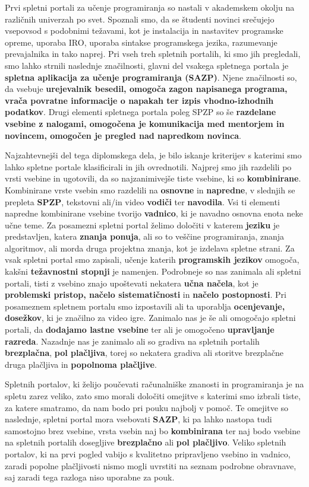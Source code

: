 Prvi spletni portali za učenje programiranja so nastali v akademskem
okolju na različnih univerzah po svet. Spoznali smo, da se študenti
novinci srečujejo vsepovsod s podobnimi težavami, kot je instalacija
in nastavitev programske opreme, uporaba IRO, uporaba sintakse
programskega jezika, razumevanje prevajalnika in tako
naprej. Pri vseh treh spletnih portalih, ki smo jih pregledali, smo
lahko strnili naslednje značilnosti, glavni del vsakega spletnega
portala je \textbf{spletna aplikacija za učenje programiranja
  (SAZP)}. Njene značilnosti so, da vsebuje \textbf{urejevalnik
  besedil, omogoča zagon napisanega programa, vrača povratne
  informacije o napakah ter izpis vhodno-izhodnih podatkov}. Drugi
elementi spletnega portala poleg SPZP so še \textbf{razdelane vsebine
  z nalogami, omogočena je komunikacija med mentorjem in novincem,
  omogočen je pregled nad napredkom novinca}.

Najzahtevnejši del tega diplomskega dela, je bilo iskanje kriterijev s
katerimi smo lahko spletne portale klasificirali in jih
ovrednotili. Najprej smo jih razdelili po vrsti vsebine in
ugotovili, da so najzanimivejše tiste vsebine, ki so
\textbf{kombinirane}. Kombinirane vrste vsebin smo razdelili na
\textbf{osnovne} in \textbf{napredne}, v slednjih se prepleta
\textbf{SPZP}, tekstovni ali/in video \textbf{vodiči} ter
\textbf{navodila}. Vsi ti elementi napredne kombinirane vsebine
tvorijo \textbf{vadnico}, ki je navadno osnovna enota neke učne teme.
Za posamezni spletni portal želimo določiti v katerem \textbf{jeziku}
je predstavljen, katera \textbf{znanja ponuja}, ali so to veščine
programiranja, znanja algoritmov, ali morda druga projektna znanja,
kot je izdelava spletne strani. Za vsak spletni portal smo zapisali,
učenje katerih \textbf{programskih jezikov} omogoča, kakšni
\textbf{težavnostni stopnji} je namenjen. Podrobneje so nas zanimala
ali spletni portali, tisti z vsebino znajo upoštevati nekatera
\textbf{učna načela}, kot je \textbf{problemski pristop, načelo
  sistematičnosti} in \textbf{načelo postopnosti}. Pri posameznem
spletnem portalu smo izpostavili ali ta uporablja \textbf{ocenjevanje,
dosežkov}, ki je značilno za video igre. Zanimalo nas je še ali
omogočajo spletni portali, da \textbf{dodajamo lastne vsebine} ter ali je
omogočeno \textbf{upravljanje razreda}. Nazadnje nas je zanimalo ali
so gradiva na spletnih portalih \textbf{brezplačna}, \textbf{pol
  plačljiva}, torej so nekatera gradiva ali storitve brezplačne druga
plačljiva in \textbf{popolnoma plačljive}.

Spletnih portalov, ki želijo poučevati računalniške znanosti in
programiranja je na spletu zarez veliko, zato smo morali določiti
omejitve s katerimi smo izbrali tiste, za katere smatramo, da nam bodo
pri pouku najbolj v pomoč. Te omejitve so naslednje, spletni portal
mora vsebovati \textbf{SAZP}, ki pa lahko nastopa tudi samostojno brez
vsebine, vrsta vsebin naj bo \textbf{kombinirana} ter naj bodo vsebine
na spletnih portalih dosegljive \textbf{brezplačno} ali \textbf{pol
  plačljivo}. Veliko spletnih portalov, ki na prvi pogled vabijo s
kvalitetno pripravljeno vsebino in vadnico, zaradi popolne
plačljivosti nismo mogli uvrstiti na seznam podrobne obravnave, saj
zaradi tega razloga niso uporabne za pouk.

